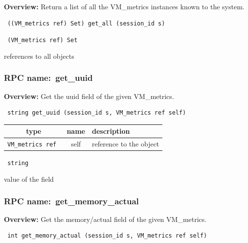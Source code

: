 {\bf Overview:} 
Return a list of all the VM\_metrics instances known to the system.

\begin{verbatim} ((VM_metrics ref) Set) get_all (session_id s)\end{verbatim}


\vspace{0.3cm}

{\tt 
(VM\_metrics ref) Set
}


references to all objects
\vspace{0.3cm}
\vspace{0.3cm}
\vspace{0.3cm}
\subsubsection{RPC name:~get\_uuid}

{\bf Overview:} 
Get the uuid field of the given VM\_metrics.

\begin{verbatim} string get_uuid (session_id s, VM_metrics ref self)\end{verbatim}



 
\vspace{0.3cm}
\begin{tabular}{|c|c|p{7cm}|}
 \hline
{\bf type} & {\bf name} & {\bf description} \\ \hline
{\tt VM\_metrics ref } & self & reference to the object \\ \hline 

\end{tabular}

\vspace{0.3cm}

{\tt 
string
}


value of the field
\vspace{0.3cm}
\vspace{0.3cm}
\vspace{0.3cm}
\subsubsection{RPC name:~get\_memory\_actual}

{\bf Overview:} 
Get the memory/actual field of the given VM\_metrics.

\begin{verbatim} int get_memory_actual (session_id s, VM_metrics ref self)\end{verbatim}


